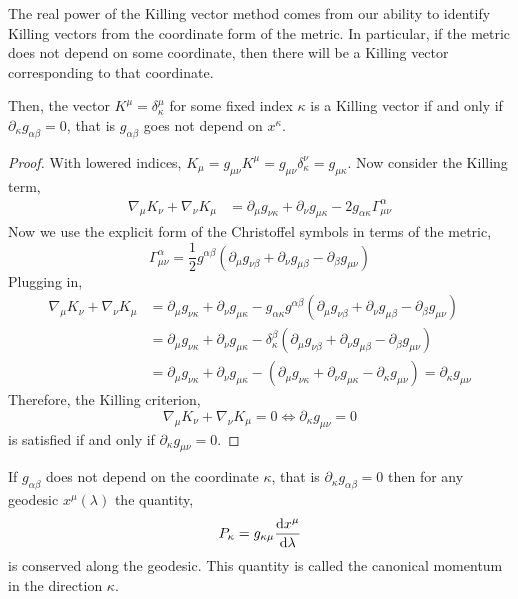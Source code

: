 \documentclass[11pt, a4paper]{article}
\begin{document}
The real power of the Killing vector method comes from our ability to identify Killing vectors from the coordinate form of the metric. In particular, if the metric does not depend on some coordinate, then there will be a Killing vector corresponding to that coordinate.

\begin{theorem}
Then, the vector $K^{\mu} = \delta_{\kappa}^{\mu}$ for some fixed index $\kappa$ is a Killing vector if and only if $\partial_{\kappa} g_{\alpha \beta} = 0$, that is $g_{\alpha \beta}$ goes not depend on $x^{\kappa}$.
\end{theorem}

\begin{proof}
With lowered indices, $K_{\mu} = g_{\mu \nu} K^\mu = g_{\mu \nu} \delta_{\kappa}^{\nu} = g_{\mu \kappa}$. Now consider the Killing term,
\begin{align*}
\nabla_{\mu} K_{\nu} + \nabla_{\nu} K_{\mu} & = \partial_{\mu} g_{\nu \kappa} + \partial_{\nu} g_{\mu \kappa} - 2 g_{\alpha \kappa} \Gamma^{\alpha}_{\mu \nu}
\end{align*}
Now we use the explicit form of the Christoffel symbols in terms of the metric,
\[ \Gamma^\alpha_{\mu \nu} = \frac{1}{2} g^{\alpha \beta} \left( \partial_{\mu} g_{\nu \beta} + \partial_{\nu} g_{\mu \beta} - \partial_{\beta} g_{\mu \nu} \right) \]
Plugging in,
\begin{align*}
\nabla_{\mu} K_{\nu} + \nabla_{\nu} K_{\mu} & = \partial_{\mu} g_{\nu \kappa} + \partial_{\nu} g_{\mu \kappa} - g_{\alpha \kappa} g^{\alpha \beta} \left( \partial_{\mu} g_{\nu \beta} + \partial_{\nu} g_{\mu \beta} - \partial_{\beta} g_{\mu \nu} \right)
\\
& = \partial_{\mu} g_{\nu \kappa} + \partial_{\nu} g_{\mu \kappa} - \delta^{\beta}_{\kappa} \left( \partial_{\mu} g_{\nu \beta} + \partial_{\nu} g_{\mu \beta} - \partial_{\beta} g_{\mu \nu} \right)
\\
& = \partial_{\mu} g_{\nu \kappa} + \partial_{\nu} g_{\mu \kappa} - \left( \partial_{\mu} g_{\nu \kappa} + \partial_{\nu} g_{\mu \kappa} - \partial_{\kappa} g_{\mu \nu} \right) = \partial_{\kappa} g_{\mu \nu}
\end{align*}
Therefore, the Killing criterion,
\[ \nabla_{\mu} K_{\nu} + \nabla_{\nu} K_{\mu} = 0 \iff \partial_{\kappa} g_{\mu \nu} = 0\]
is satisfied if and only if $\partial_{\kappa} g_{\mu \nu} = 0$.
\end{proof}

\begin{corollary}
If $g_{\alpha \beta}$ does not depend on the coordinate $\kappa$, that is $\partial_\kappa g_{\alpha \beta} = 0$ then for any geodesic $x^{\mu}(\lambda)$ the quantity,
\[P_\kappa = g_{\kappa \mu} \frac{\mathrm{d}x^{\mu}}{\mathrm{d}\lambda} \]
is conserved along the geodesic. This quantity is called the canonical momentum in the direction $\kappa$.  
\end{corollary} 
\end{document}

